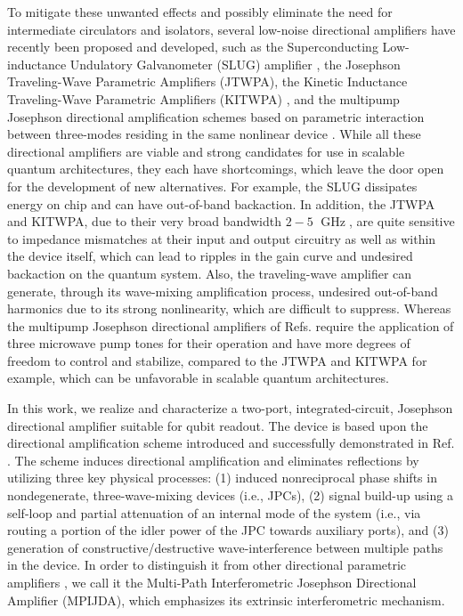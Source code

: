 \documentclass[aip,onecolumn,10pt]{revtex4}%
\begin{document}
To mitigate these unwanted effects and possibly eliminate the need for intermediate circulators and isolators, several low-noise directional amplifiers have recently been proposed and developed, such as the Superconducting Low-inductance Undulatory Galvanometer (SLUG) amplifier \cite{SLUGThy,SLUGExp,HFslug}, the Josephson Traveling-Wave Parametric Amplifiers (JTWPA)\cite{TWPIrfan,JTWPA,TWPAthreewavemix}, the Kinetic Inductance Traveling-Wave Parametric Amplifiers (KITWPA) \cite{KIT}, and the multipump Josephson directional amplification schemes based on parametric interaction between three-modes residing in the same nonlinear device \cite{ReconfJJCircAmpl,NRAumentado1,NRAumentado2}. While all these directional amplifiers are viable and strong candidates for use in scalable quantum architectures, they each have shortcomings, which leave the door open for the development of new alternatives. For example, the SLUG dissipates energy on chip and can have out-of-band backaction. In addition, the JTWPA and KITWPA, due to their very broad bandwidth $2-5$ $\operatorname{GHz}$, are quite sensitive to impedance mismatches at their input and output circuitry as well as within the device itself, which can lead to ripples in the gain curve and undesired backaction on the quantum system. Also, the traveling-wave amplifier can generate, through its wave-mixing amplification process, undesired out-of-band harmonics due to its strong nonlinearity, which are difficult to suppress. Whereas the multipump Josephson directional amplifiers of Refs. \cite{ReconfJJCircAmpl,NRAumentado2} require the application of three microwave pump tones for their operation and have more degrees of freedom to control and stabilize, compared to the JTWPA and KITWPA for example, which can be unfavorable in scalable quantum architectures. 

In this work, we realize and characterize a two-port, integrated-circuit, Josephson directional amplifier suitable for qubit readout. The device is based upon the directional amplification scheme introduced and successfully demonstrated in Ref. \cite{JDA}. The scheme induces directional amplification and eliminates reflections by utilizing three key physical processes: (1) induced nonreciprocal phase shifts in nondegenerate, three-wave-mixing devices (i.e., JPCs), (2) signal build-up using a self-loop and partial attenuation of an internal mode of the system (i.e., via routing a portion of the idler power of the JPC towards auxiliary ports), and (3) generation of constructive/destructive wave-interference between multiple paths in the device. In order to distinguish it from other directional parametric amplifiers \cite{ReconfJJCircAmpl,NRAumentado2}, we call it the Multi-Path Interferometric Josephson Directional Amplifier (MPIJDA), which emphasizes its extrinsic interferometric mechanism.
\end{document}
